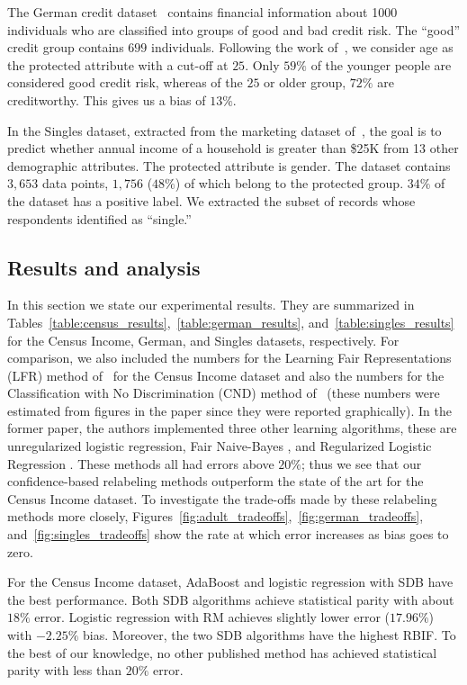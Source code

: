\documentclass[conference]{IEEEtran}
\begin{document}
The German credit dataset~\cite{Lichman13} contains financial information about
1000 individuals who are classified into groups of good and bad credit risk.
The ``good'' credit group contains $699$ individuals. Following the work
of~\cite{KamiranC09}, we consider age as the protected attribute with a cut-off
at $25$. Only $59\%$ of the younger people are considered good credit risk,
whereas of the $25$ or older group, $72\%$ are creditworthy. This gives us a
bias of $13\%$.

In the Singles dataset, extracted from the marketing dataset
of~\cite{HastieTF09}, the goal is to predict whether annual income of a
household is greater than \$25K from 13 other demographic attributes.  The
protected attribute is gender.  The dataset contains $3,653$ data points,
$1,756$ ($48\%$) of which belong to the protected group. $34\%$ of the dataset
has a positive label.  We extracted the subset of records whose respondents
identified as ``single.''

\subsection{Results and analysis}\label{sec:results}

In this section we state our experimental results. They are summarized in
Tables~\ref{table:census_results},~\ref{table:german_results},
and~\ref{table:singles_results} for the Census Income, German, and Singles
datasets, respectively.  For comparison, we also included the numbers for the
Learning Fair Representations (LFR) method of~\cite{ZemelWSPD13} for the Census
Income dataset and also the numbers for the Classification with No
Discrimination (CND) method of~\cite{KamiranC09} (these numbers were estimated
from figures in the paper since they were reported graphically). In the
former paper, the authors implemented three other learning algorithms, these
are unregularized logistic regression, Fair Naive-Bayes \cite{KamiranC09}, and
Regularized Logistic Regression \cite{KamashimaAS11}.  These methods all had
errors above $20\%$; thus we see that our confidence-based relabeling methods
outperform the state of the art for the Census Income dataset.  To investigate
the trade-offs made by these relabeling methods more closely,
Figures~\ref{fig:adult_tradeoffs},~\ref{fig:german_tradeoffs},
and~\ref{fig:singles_tradeoffs} show the rate at which error increases as bias
goes to zero.

For the Census Income dataset, AdaBoost and logistic regression with SDB have
the best performance. Both SDB algorithms achieve statistical parity with
about $18\%$ error. Logistic regression with RM achieves slightly lower error
($17.96\%$) with $-2.25\%$ bias.  Moreover, the two SDB algorithms have the
highest RBIF. To the best of our knowledge, no other published method has
achieved statistical parity with less than $20\%$ error.
\end{document}
